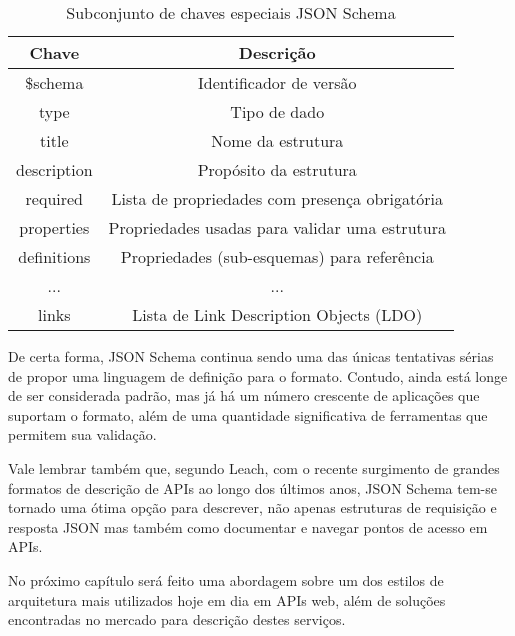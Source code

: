 \begin{table}[ht!]
  \centering
  \begin{tabular}{|c|c|}
    \hline
    Chave & Descrição \\
    \hline
    \$schema & Identificador de versão \\
    \hline
    type & Tipo de dado \\
    \hline
    title & Nome da estrutura \\
    \hline
    description & Propósito da estrutura \\
    \hline
    required & Lista de propriedades com presença obrigatória \\
    \hline
    properties & Propriedades usadas para validar uma estrutura \\
    \hline
    definitions & Propriedades (sub-esquemas) para referência \\
    \hline
    ... & ... \\
    \hline
    links & Lista de Link Description Objects (LDO) \\
    \hline
  \end{tabular}
  \caption{Subconjunto de chaves especiais JSON Schema}
\end{table}

De certa forma, JSON Schema continua sendo uma das únicas tentativas sérias de propor uma linguagem de definição para o formato. Contudo, ainda está longe de ser considerada padrão, mas já há um número crescente de aplicações que suportam o formato, além de uma quantidade significativa de ferramentas que permitem sua validação. \cite{PezoaEtAl2016}

Vale lembrar também que, segundo Leach, com o recente surgimento de grandes formatos de descrição de APIs ao longo dos últimos anos, JSON Schema tem-se tornado uma ótima opção para descrever, não apenas estruturas de requisição e resposta JSON mas também como documentar e navegar pontos de acesso em APIs. \cite{Leach2014}

No próximo capítulo será feito uma abordagem sobre um dos estilos de arquitetura mais utilizados hoje em dia em APIs web, além de soluções encontradas no mercado para descrição destes serviços.
